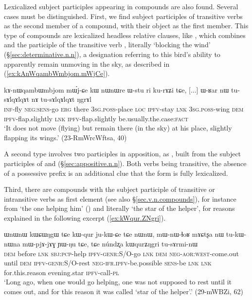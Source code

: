 Lexicalized subject participles appearing in compounds are also found. Several cases must be distinguished. First, we find subject participles of transitive verbs as the second member of a compound, with their object as the first member. This type of compounds are lexicalized headless relative clauses, like , which combines   and the participle   of the transitive verb , literally `blocking the wind'   (§\ref{sec:determinative.n.n}), a designation referring to this bird's ability to apparently remain unmoving in the sky, as described in (\ref{ex:kAnWqambWmbjom.mWjCe}).

\begin{exe}
\ex \label{ex:kAnWqambWmbjom.mWjCe}
 \gll  kɤ-nɯqambɯmbjom mɯ́j-ɕe kɯ nɯnɯre ɯ-stu ri ku-rɤʑi tɕe, [...] ɯ-ʁar nɯ tu-sɤlqɤlqɤt nɤ tu-sɤlqɤlqɤt ŋgrɤl  \\
 \textsc{inf}-fly \textsc{neg}:\textsc{sens}-go \textsc{erg} there \textsc{3sg}.\textsc{poss}-place \textsc{loc} \textsc{ipfv}-stay \textsc{lnk} { } \textsc{3sg}.\textsc{poss}-wing \textsc{dem} \textsc{ipfv}-flap.slightly \textsc{lnk}  \textsc{ipfv}-flap.slightly be.usually.the.case:\textsc{fact} \\
 \glt `It does not move (flying) but remain there (in the sky) at his place, slightly flapping its wings.' (23-RmWrcWftsa, 40)
\end{exe}

A second type involves two participles in apposition, as , built from the subject participles of  and   (§\ref{sec:appositive.n.n}). Both verbs being transitive, the absence of a possessive prefix  is an additional clue that the form is fully lexicalized.

Third, there are compounds with the subject participle of transitive or intransitive verbs as first element (see also §\ref{sec.v.n.compounds}), for instance  from  `the one helping him' () and  literally `the star of the helper', for reasons explained in the following excerpt (\ref{ex:kWqur.ZNgri}).

\begin{exe}
\ex \label{ex:kWqur.ZNgri}
\gll ɯnɯnɯ kɯɕɯŋgɯ tɕe kɯ-qur ju-kɯ-ɕe tɕe nɯnɯ, mɯ-nɯ-ɬoʁ mɤɕtʂa nɯ tu-kɯ-nɯna mɯ-pjɤ-jɤɣ ɲɯ-ŋu tɕe,  tɕe núndʐa kɯqurʑŋgri tu-sɤrmi-nɯ \\
\textsc{dem} before \textsc{lnk} \textsc{sbj}:\textsc{pcp}-help \textsc{ipfv}-\textsc{genr}:S/O-go \textsc{lnk} \textsc{dem} \textsc{neg}-\textsc{aor}:\textsc{west}-come.out until \textsc{dem} \textsc{ipfv}-\textsc{genr}:S/O-rest \textsc{neg}-\textsc{ifr}.\textsc{ipfv}-be.possible \textsc{sens}-be \textsc{lnk} \textsc{lnk} for.this.reason evening.star \textsc{ipfv}-call-\textsc{pl} \\
\glt `Long ago, when one would go helping, one was not supposed to rest until it comes out, and for this reason it was called `star of the helper'.' (29-mWBZi, 62)
\end{exe}

